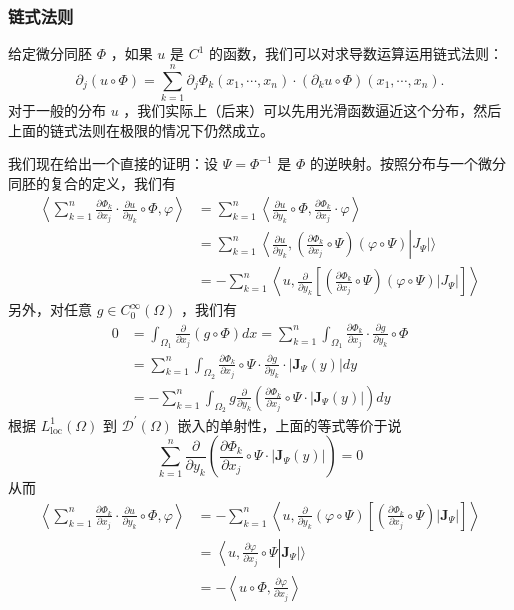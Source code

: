 \subsubsection{链式法则}

给定微分同胚 $\Phi$ ，如果 $u$ 是 $C^1$ 的函数，我们可以对求导数运算运用链式法则：
\[
\partial_j(u \circ \Phi)=\sum_{k=1}^n \partial_j \Phi_k\left(x_1, \cdots, x_n\right) \cdot\left(\partial_k u \circ \Phi\right)\left(x_1, \cdots, x_n\right) .
\]
对于一般的分布 $u$ ，我们实际上（后来）可以先用光滑函数逼近这个分布，然后上面的链式法则在极限的情况下仍然成立。

我们现在给出一个直接的证明：设 $\Psi=\Phi^{-1}$ 是 $\Phi$ 的逆映射。按照分布与一个微分同胚的复合的定义，我们有
\[
\begin{aligned}
\left\langle\sum_{k=1}^n \frac{\partial \Phi_k}{\partial x_j} \cdot \frac{\partial u}{\partial y_k} \circ \Phi, \varphi\right\rangle & =\sum_{k=1}^n\left\langle\frac{\partial u}{\partial y_k} \circ \Phi, \frac{\partial \Phi_k}{\partial x_j} \cdot \varphi\right\rangle \\
& =\sum_{k=1}^n\left\langle\frac{\partial u}{\partial y_k},\left(\frac{\partial \Phi_k}{\partial x_j} \circ \Psi\right)(\varphi \circ \Psi)\right| J_{\Psi}| \rangle \\
& =-\sum_{k=1}^n\left\langle u, \frac{\partial}{\partial y_k}\left[\left(\frac{\partial \Phi_k}{\partial x_j} \circ \Psi\right)(\varphi \circ \Psi)\left|J_{\Psi}\right|\right]\right\rangle
\end{aligned}
\]
另外，对任意 $g \in C_0^{\infty}(\Omega)$ ，我们有
\[
\begin{aligned}
0 & =\int_{\Omega_1} \frac{\partial}{\partial x_j}(g \circ \Phi) d x=\sum_{k=1}^n \int_{\Omega_1} \frac{\partial \Phi_k}{\partial x_j} \cdot \frac{\partial g}{\partial y_k} \circ \Phi \\
& =\sum_{k=1}^n \int_{\Omega_2} \frac{\partial \Phi_k}{\partial x_j} \circ \Psi \cdot \frac{\partial g}{\partial y_k} \cdot\left|\mathbf{J}_{\Psi}(y)\right| d y \\
& =-\sum_{k=1}^n \int_{\Omega_2} g \frac{\partial}{\partial y_k}\left(\frac{\partial \Phi_k}{\partial x_j} \circ \Psi \cdot\left|\mathbf{J}_{\Psi}(y)\right|\right) d y
\end{aligned}
\]
根据 $L_{\mathrm{loc}}^1(\Omega)$ 到 $\mathcal{D}^{\prime}(\Omega)$ 嵌入的单射性，上面的等式等价于说
\[
\sum_{k=1}^n \frac{\partial}{\partial y_k}\left(\frac{\partial \Phi_k}{\partial x_j} \circ \Psi \cdot\left|\mathbf{J}_{\Psi}(y)\right|\right)=0
\]
从而
\[
\begin{aligned}
\left\langle\sum_{k=1}^n \frac{\partial \Phi_k}{\partial x_j} \cdot \frac{\partial u}{\partial y_k} \circ \Phi, \varphi\right\rangle & =-\sum_{k=1}^n\left\langle u, \frac{\partial}{\partial y_k}(\varphi \circ \Psi)\left[\left(\frac{\partial \Phi_k}{\partial x_j} \circ \Psi\right)\left|\mathbf{J}_{\Psi}\right|\right]\right\rangle \\
& =\left\langle u, \frac{\partial \varphi}{\partial x_j} \circ \Psi\right| \mathbf{J}_{\Psi}| \rangle \\
& =-\left\langle u \circ \Phi, \frac{\partial \varphi}{\partial x_j}\right\rangle
\end{aligned}
\]
